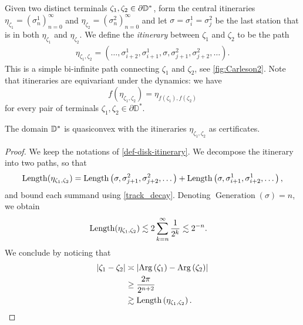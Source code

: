 \begin{definition} \label{def-disk-itinerary} Given two distinct terminals $\zeta_{1},\zeta_{2}\in\partial\mathbb{D}^*$, form the central itineraries $\eta_{\zeta_{1}}=\left(\sigma_{n}^{1}\right)_{n=0}^{\infty}$ and 
	$\eta_{\zeta_{2}}=\left(\sigma_{n}^{2}\right)_{n=0}^{\infty}$
	 and let  $\sigma=\sigma^1_i=\sigma^2_j$ be the last station that is in both $\eta_{\zeta_{1}}$ and $\eta_{\zeta_{2}}$. %
	 We define the \emph{itinerary} between  $\zeta_{1}$ and $\zeta_{2}$ to be the path  %
 \begin{gather*}
 \eta_{\zeta_{1},\zeta_{2}}=  \left(\dots,\sigma_{i+2}^{1},\sigma_{i+1}^{1},\sigma,\sigma_{j+1}^{2},\sigma_{j+2}^{2},\dots\right).
 \end{gather*}
	This is a simple bi-infinite path connecting $\zeta_{1}$ and $\zeta_{2}$, see \cref{fig:Carleson2}. Note that itineraries are equivariant under the dynamics: we have  \begin{equation}
		f(\eta_{\zeta_1,\zeta_2})=\eta_{f(\zeta_1),f(\zeta_2)}
	\end{equation} for every pair of terminals $\zeta_1,\zeta_2 \in \partial \mathbb D^*$.
	
	
\end{definition}


\begin{theorem} \label{quasiconvex disk}
The domain $\mathbb{D}^{*}$ is quasiconvex with the itineraries $\eta_{\zeta_1,\zeta_2}$ as certificates.
\end{theorem}

\begin{proof}
We keep the notations of \cref{def-disk-itinerary}.
We decompose the itinerary into two paths, so that
\begin{equation}
\operatorname{Length}(\eta_{\zeta_{1},\zeta_{2}})=\operatorname{Length}\left(\sigma,\sigma_{j+1}^{2},\sigma_{j+2}^{2},\dots\right)
+\operatorname{Length}\left(\sigma,\sigma_{i+1}^{1},\sigma_{i+2}^{1},\dots\right),
\end{equation}
and bound each summand using \cref{track_decay}. Denoting $\operatorname{Generation}(\sigma)=n$, we obtain
\begin{align*}
\operatorname{Length}(\eta_{\zeta_{1},\zeta_{2}})
&\lesssim 2 \sum_{k=n}^{\infty}\frac{1}{2^{k}} 
\lesssim2^{-n}. \label{eq:1}
\end{align*}
We conclude by noticing that
\begin{align*}
\left|\zeta_{1}-\zeta_{2}\right|
&\asymp
\left|\operatorname{Arg}\left(\zeta_{1}\right)-\operatorname{Arg}\left(\zeta_{2}\right)\right|\\
&\geq \frac {2\pi}{2^{n+2}}\\
&\gtrsim 	\operatorname{Length}\left(\eta_{\zeta_{1},\zeta_{2}}\right).
\end{align*}
\end{proof}

